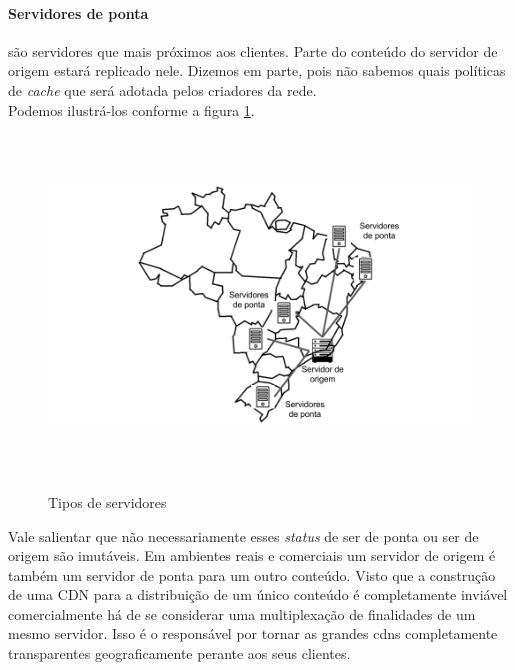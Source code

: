 \paragraph{Servidores de ponta}s\~ao servidores que mais pr\'oximos aos clientes. Parte do conte\'udo do servidor de origem estar\'a replicado nele. Dizemos em parte, pois n\~ao sabemos quais pol\'iticas de \textit{cache} que ser\'a adotada pelos criadores da rede. 
\\
Podemos ilustr\'a-los conforme a figura \ref{figura:tipos_servidores}.
\begin{figure}[H]
\caption{Tipos de servidores}
\includegraphics[height=9cm]{Figuras/tipos_servidores.png} 
\label{figura:tipos_servidores} 
\end{figure}

Vale salientar que n\~ao necessariamente esses \textit{status} de ser de ponta ou ser de origem s\~ao imut\'aveis. Em ambientes reais e comerciais um servidor de origem \'e tamb\'em um servidor de ponta para um outro conte\'udo. Visto que a constru\c{c}\~ao de uma CDN para a distribui\c{c}\~ao de um \'unico conte\'udo \'e completamente invi\'avel comercialmente h\'a de se considerar uma multiplexa\c{c}\~ao de finalidades de um mesmo servidor. Isso \'e o respons\'avel por tornar as grandes cdns completamente transparentes geograficamente perante aos seus clientes.